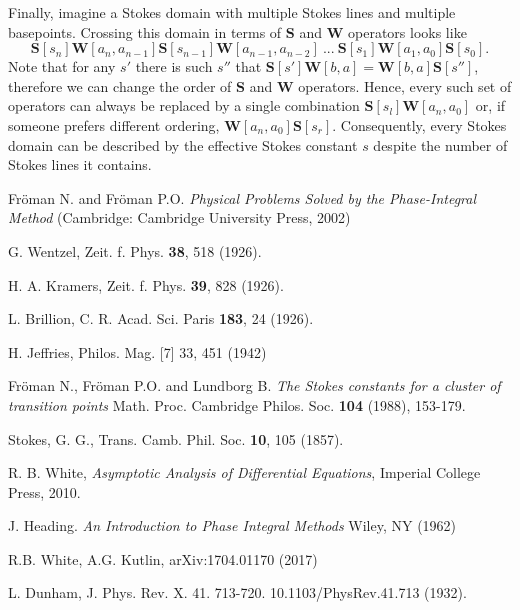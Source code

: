 \documentclass[atmp]{ipart_v1}
\def\S{\bm{S}}
\def\W{\bm{W}}
\begin{document}
Finally, imagine a Stokes domain with multiple Stokes lines and multiple basepoints. Crossing this 
domain in terms of $\S$ and $\W$ operators looks like
\begin{equation}
\S[s_n]\W[a_n,a_{n-1}]\S[s_{n-1}]\W[a_{n-1},a_{n-2}]\ ...\ \S[s_1]\W[a_1,a_0]\S[s_0].
\end{equation}
Note that for any $s'$ there is such $s''$ that $\S[s']\W[b,a]=\W[b,a]\S[s'']$, therefore
we can change the order of $\S$ and $\W$ operators. Hence,
every such set of operators can always be replaced by a single combination $\S[s_l] \W[a_n,a_0]$ or, 
if someone prefers different ordering, $\W[a_n,a_0] \S[s_r]$. Consequently, every Stokes domain can 
be described by the effective Stokes constant $s$ despite the number of Stokes lines it contains.


\begin{thebibliography}{30}

 Fr\"oman N. and Fr\"oman P.O. \textit{Physical Problems Solved by the Phase-Integral Method} (Cambridge: Cambridge University Press, 2002)

 G. Wentzel, Zeit. f. Phys. \textbf{38}, 518 (1926).

 H. A. Kramers, Zeit. f. Phys. \textbf{39}, 828 (1926).

 L. Brillion, C. R. Acad. Sci. Paris \textbf{183}, 24 (1926).

 H. Jeffries, Philos. Mag. [7] 33, 451 (1942)

 Fr\"oman N., Fr\"oman P.O. and Lundborg B. \textit{The Stokes constants for a cluster of transition
points} Math. Proc. Cambridge Philos. Soc. \textbf{104} (1988), 153-179.


 Stokes, G. G., Trans. Camb. Phil. Soc. \textbf{10}, 105 (1857).

 R. B. White,
 {\it Asymptotic Analysis of Differential Equations}, Imperial College Press, 2010.

 J. Heading. {\it An Introduction to Phase Integral Methods} 
Wiley, NY (1962)

 R.B. White, A.G. Kutlin, arXiv:1704.01170 (2017)

 L. Dunham, J. Phys. Rev. X. 41. 713-720. 10.1103/PhysRev.41.713 (1932).
 

\end{thebibliography}
\end{document}
